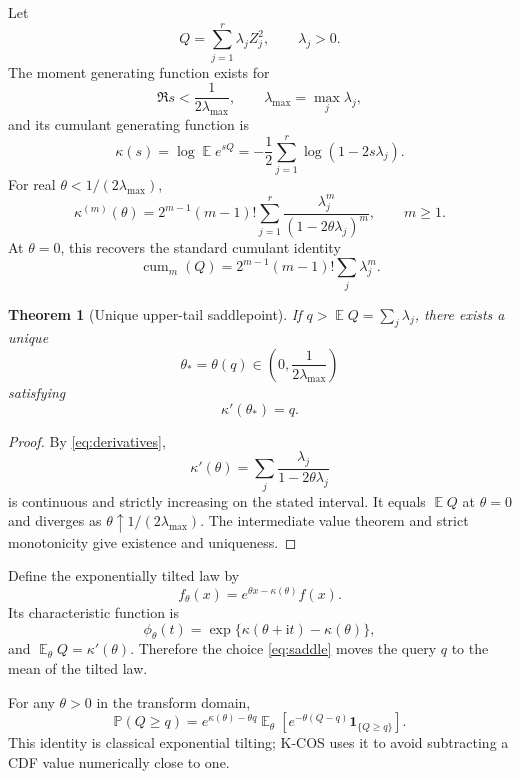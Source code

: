 \documentclass[11pt]{article}
\newtheorem{theorem}{Theorem}[section]
\theoremstyle{definition}
\DeclareMathOperator{\E}{\mathbb E}
\newcommand{\Pp}{\mathbb P}
\newcommand{\ii}{\mathrm{i}}
\begin{document}
Let
\begin{equation}
Q=\sum_{j=1}^{r}\lambda_j Z_j^2,
\qquad \lambda_j>0.
\label{eq:Q}
\end{equation}
The moment generating function exists for
\[
\Re s < \frac{1}{2\lambda_{\max}},
\qquad
\lambda_{\max}=\max_j\lambda_j,
\]
and its cumulant generating function is
\begin{equation}
\kappa(s)=\log \E e^{sQ}
=-\frac12\sum_{j=1}^{r}\log(1-2s\lambda_j).
\label{eq:cgf}
\end{equation}
For real $\theta<1/(2\lambda_{\max})$,
\begin{equation}
\kappa^{(m)}(\theta)
=2^{m-1}(m-1)!\sum_{j=1}^{r}
\frac{\lambda_j^m}{(1-2\theta\lambda_j)^m},
\qquad m\ge1.
\label{eq:derivatives}
\end{equation}
At $\theta=0$, this recovers the standard cumulant identity
\[
\operatorname{cum}_m(Q)=2^{m-1}(m-1)!\sum_j\lambda_j^m.
\]

\begin{theorem}[Unique upper-tail saddlepoint]
\label{thm:saddle}
If $q>\E Q=\sum_j\lambda_j$, there exists a unique
\[
\theta_*=\theta(q)\in\left(0,\frac{1}{2\lambda_{\max}}\right)
\]
satisfying
\begin{equation}
\kappa'(\theta_*)=q.
\label{eq:saddle}
\end{equation}
\end{theorem}

\begin{proof}
By \eqref{eq:derivatives},
\[
\kappa'(\theta)=\sum_j\frac{\lambda_j}{1-2\theta\lambda_j}
\]
is continuous and strictly increasing on the stated interval. It equals $\E Q$ at $\theta=0$ and diverges as $\theta\uparrow1/(2\lambda_{\max})$. The intermediate value theorem and strict monotonicity give existence and uniqueness.
\end{proof}

Define the exponentially tilted law by
\begin{equation}
f_{\theta}(x)=e^{\theta x-\kappa(\theta)}f(x).
\label{eq:tilt-density}
\end{equation}
Its characteristic function is
\begin{equation}
\phi_{\theta}(t)
=\exp\{\kappa(\theta+\ii t)-\kappa(\theta)\},
\label{eq:tilt-cf}
\end{equation}
and $\E_{\theta}Q=\kappa'(\theta)$. Therefore the choice \eqref{eq:saddle} moves the query $q$ to the mean of the tilted law.

For any $\theta>0$ in the transform domain,
\begin{equation}
\Pp(Q\ge q)
=e^{\kappa(\theta)-\theta q}
\E_{\theta}\!\left[e^{-\theta(Q-q)}\mathbf 1_{\{Q\ge q\}}\right].
\label{eq:tilt-tail}
\end{equation}
This identity is classical exponential tilting; K-COS uses it to avoid subtracting a CDF value numerically close to one.
\end{document}
